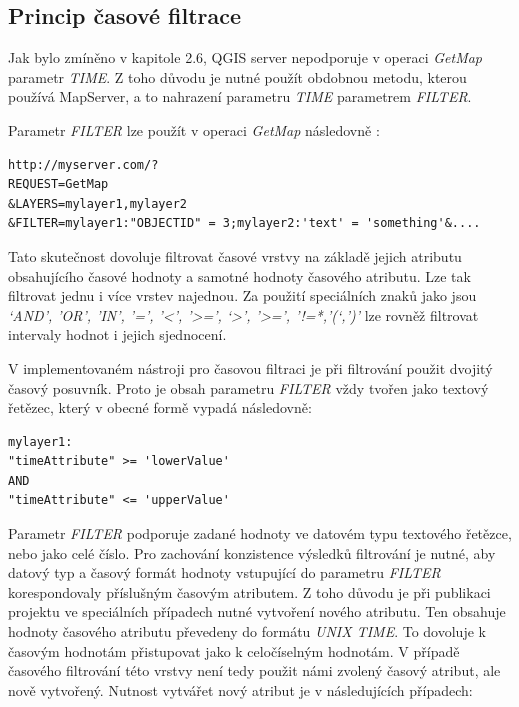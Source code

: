 \subsection{Princip časové filtrace}
Jak bylo zmíněno v kapitole 2.6, QGIS server nepodporuje v operaci \textit{GetMap} parametr \textit{TIME}. Z toho důvodu je nutné použít obdobnou metodu, kterou používá MapServer, a to nahrazení parametru \textit{TIME} parametrem \textit{FILTER}.

\noindent
Parametr \textit{FILTER} lze použít v operaci \textit{GetMap} následovně \cite{qgis-service}:
\begin{verbatim}
http://myserver.com/?
REQUEST=GetMap
&LAYERS=mylayer1,mylayer2
&FILTER=mylayer1:"OBJECTID" = 3;mylayer2:'text' = 'something'&....
\end{verbatim}

Tato skutečnost dovoluje filtrovat časové vrstvy na základě jejich atributu obsahujícího časové hodnoty a samotné hodnoty časového atributu. Lze tak filtrovat jednu i více vrstev najednou. Za použití speciálních znaků jako jsou \textit{‘AND’, ’OR’, ’IN’, ’=’, ’<’, ’>=’,  ‘>’, ’>=’, ’!=*,’(‘,’)’} lze rovněž filtrovat intervaly hodnot i jejich sjednocení.

V implementovaném nástroji pro časovou filtraci je při filtrování použit dvojitý časový posuvník. Proto je obsah parametru \textit{FILTER} vždy tvořen jako textový řetězec, který v obecné formě vypadá následovně:

\begin{verbatim}
mylayer1:
"timeAttribute" >= 'lowerValue' 
AND 
"timeAttribute" <= 'upperValue'
\end{verbatim}

Parametr \textit{FILTER} podporuje zadané hodnoty ve datovém typu textového řetězce, nebo jako celé číslo. Pro zachování konzistence výsledků filtrování je nutné, aby datový typ a časový formát hodnoty vstupující do parametru \textit{FILTER} korespondovaly příslušným časovým atributem. Z toho důvodu je při publikaci projektu ve speciálních případech nutné vytvoření nového atributu. Ten obsahuje hodnoty časového atributu převedeny do formátu \textit{UNIX TIME}. To dovoluje k časovým hodnotám přistupovat jako k celočíselným hodnotám. V případě časového filtrování této vrstvy není tedy použit námi zvolený časový atribut, ale nově vytvořený. Nutnost vytvářet nový atribut je v následujících případech:

